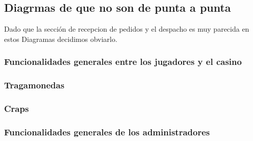 \subsection{Diagrmas de que no son de punta a punta}
Dado que la sección de recepcion de pedidos y el despacho es muy parecida en estos Diagramas 
decidimos obviarlo.


\subsubsection{Funcionalidades generales entre los jugadores y el casino}



\subsubsection{Tragamonedas}



\subsubsection{Craps}



\subsubsection{Funcionalidades generales de los administradores}

